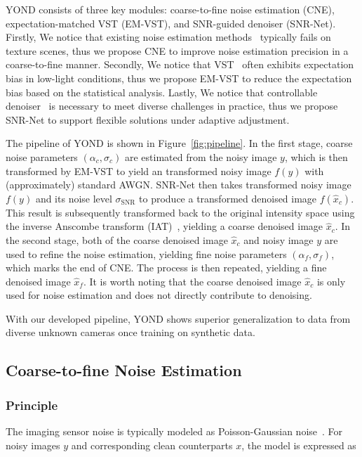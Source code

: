 \documentclass[lettersize,journal]{IEEEtran}
\begin{document}
	YOND consists of three key modules: coarse-to-fine noise estimation (CNE), expectation-matched VST (EM-VST), and SNR-guided denoiser (SNR-Net). 
	Firstly, We notice that existing noise estimation methods~\cite{P-G,2013ICIP/Liu,CVPR21/FBI} typically fails on texture scenes, thus we propose CNE to improve noise estimation precision in a coarse-to-fine manner. 
	Secondly, We notice that VST~\cite{ANSCOMBE,GAT,TIP11/VST} often exhibits expectation bias in low-light conditions, thus we propose EM-VST to reduce the expectation bias based on the statistical analysis. 
	Lastly, We notice that controllable denoiser~\cite{CVPR19/DNI,CVPR19/AdaFM,ECCV20/CResMD,PR24/CFMNet} is necessary to meet diverse challenges in practice, thus we propose SNR-Net to support flexible solutions under adaptive adjustment.
	
	The pipeline of YOND is shown in Figure~\ref{fig:pipeline}. 
	In the first stage, coarse noise parameters $(\alpha_c, \sigma_c)$ are estimated from the noisy image $y$, which is then transformed by EM-VST to yield an transformed noisy image $f(y)$ with (approximately) standard AWGN. SNR-Net then takes transformed noisy image $f(y)$ and its noise level $\sigma_{\text{SNR}}$ to produce a transformed denoised image $f(\hat{x}_c)$. This result is subsequently transformed back to the original intensity space using the inverse Anscombe transform (IAT)~\cite{TIP11/VST}, yielding a coarse denoised image $\hat{x}_c$.
	In the second stage, both of the coarse denoised image $\hat{x}_c$ and noisy image $y$ are used to refine the noise estimation, yielding fine noise parameters $(\alpha_f, \sigma_f)$, which marks the end of CNE. The process is then repeated, yielding a fine denoised image $\hat{x}_f$. It is worth noting that the coarse denoised image $\hat{x}_c$ is only used for noise estimation and does not directly contribute to denoising.
	
	With our developed pipeline, YOND shows superior generalization to data from diverse unknown cameras once training on synthetic data.
	
	\subsection{Coarse-to-fine Noise Estimation}\label{sec:CNE}
	\subsubsection{\textbf{Principle}}
	The imaging sensor noise is typically modeled as Poisson-Gaussian noise~\cite{P-G}. For noisy images $y$ and corresponding clean counterparts $x$, the model is expressed as
	
\end{document}
